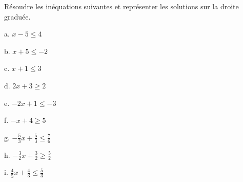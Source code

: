 
Résoudre les inéquations suivantes et représenter les solutions sur la droite graduée.

\begin{description}
\begin{minipage}{0.3\linewidth}

\item[a. ] $x-5 \leq 4$
\item[b. ] $x+5 \leq -2$
\item[c. ] $x+1 \leq 3$
\end{minipage}
\begin{minipage}{0.3\linewidth}
\item[d. ] $2x+3 \geq 2$
\item[e. ] $-2x+1 \leq -3$
\item[f. ] $-x+4 \geq 5$
\end{minipage}
\begin{minipage}{0.3\linewidth}
\item[g. ] $-\frac{5}{3}x+\frac{5}{3} \leq \frac{7}{6}$
\item[h. ] $-\frac{3}{2}x+ \frac{3}{2} \geq \frac{5}{2}$
\item[i. ] $\frac{4}{5}x+\frac{4}{3} \leq \frac{5}{3}$
\end{minipage}
\end{description}

